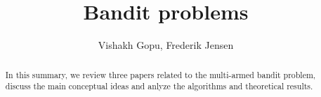 \documentclass[letterpaper]{article}
\title{Bandit problems}
\author{Vishakh Gopu,  Frederik Jensen} %
\begin{document}
\maketitle

\begin{abstract}
  In this summary, we review three papers related to the multi-armed bandit problem, discuss
  the main conceptual ideas and anlyze the algorithms and theoretical results. 
\end{abstract}


\unskip

\unskip

\unskip

\unskip

\unskip
%



\appendix
\end{document}
